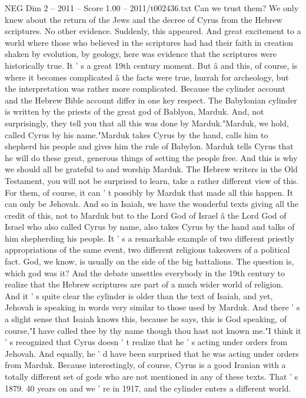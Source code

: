\begin{textsample}{NEG Dim 2 – 2011 – Score 1.00 – 2011/t002436.txt}
Can we trust them?
We only knew about the return of the Jews and the decree of Cyrus from the Hebrew scriptures.
No other evidence.
Suddenly, this appeared.
And great excitement to a world where those who believed in the scriptures had had their faith in creation shaken by evolution, by geology, here was evidence that the scriptures were historically true.
It ' s a great 19th century moment.
But â and this, of course, is where it becomes complicated â the facts were true, hurrah for archeology, but the interpretation was rather more complicated.
Because the cylinder account and the Hebrew Bible account differ in one key respect.
The Babylonian cylinder is written by the priests of the great god of Bablyon, Marduk.
And, not surprisingly, they tell you that all this was done by Marduk."Marduk, we hold, called Cyrus by his name."Marduk takes Cyrus by the hand, calls him to shepherd his people and gives him the rule of Babylon.
Marduk tells Cyrus that he will do these great, generous things of setting the people free.
And this is why we should all be grateful to and worship Marduk.
The Hebrew writers in the Old Testament, you will not be surprised to learn, take a rather different view of this.
For them, of course, it can ' t possibly by Marduk that made all this happen.
It can only be Jehovah.
And so in Isaiah, we have the wonderful texts giving all the credit of this, not to Marduk but to the Lord God of Israel â the Lord God of Israel who also called Cyrus by name, also takes Cyrus by the hand and talks of him shepherding his people.
It ' s a remarkable example of two different priestly appropriations of the same event, two different religious takeovers of a political fact.
God, we know, is usually on the side of the big battalions.
The question is, which god was it?
And the debate unsettles everybody in the 19th century to realize that the Hebrew scriptures are part of a much wider world of religion.
And it ' s quite clear the cylinder is older than the text of Isaiah, and yet, Jehovah is speaking in words very similar to those used by Marduk.
And there ' s a slight sense that Isaiah knows this, because he says, this is God speaking, of course,"I have called thee by thy name though thou hast not known me."I think it ' s recognized that Cyrus doesn ' t realize that he ' s acting under orders from Jehovah.
And equally, he ' d have been surprised that he was acting under orders from Marduk.
Because interestingly, of course, Cyrus is a good Iranian with a totally different set of gods who are not mentioned in any of these texts.
That ' s 1879. 40 years on and we ' re in 1917, and the cylinder enters a different world.

\end{textsample}
